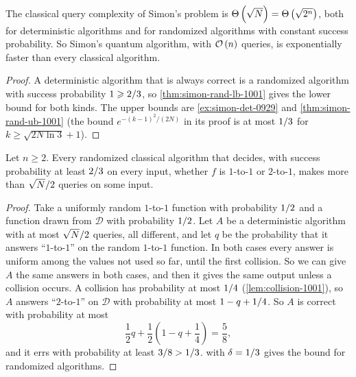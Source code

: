 \begin{corollary}\label{thm:simon-det-lb-1001}
    The classical query complexity of Simon's problem is $\Theta\left(\sqrt{N}\right) = \Theta\left(\sqrt{2^n}\right)$, both
    for deterministic algorithms and for randomized algorithms with constant success probability.
    So Simon's quantum algorithm, with $\mathcal{O}\left(n\right)$ queries, is exponentially faster than every
    classical algorithm.
\end{corollary}

\begin{proof}
    A deterministic algorithm that is always correct is a randomized algorithm with success
    probability $1 \geqslant 2/3$, so \cref{thm:simon-rand-lb-1001} gives the lower bound for both
    kinds. The upper bounds are \cref{ex:simon-det-0929} and \cref{thm:simon-rand-ub-1001} (the
    bound $e^{-(k-1)^2/(2N)}$ in its proof is at most $1/3$ for $k \geq \sqrt{2N \ln 3} + 1$).
\end{proof}

\begin{corollary}\label{cor:simon-decision-1001}
    Let $n \geq 2$. Every randomized classical algorithm that decides, with success probability at
    least $2/3$ on every input, whether $f$ is $1$-to-$1$ or $2$-to-$1$, makes more than
    $\sqrt{N}/2$ queries on some input.
\end{corollary}

\begin{proof}
    Take a uniformly random $1$-to-$1$ function with probability $1/2$ and a function drawn
    from $\mathcal{D}$ with probability $1/2$. Let $A$ be a deterministic algorithm with at
    most $\sqrt{N}/2$ queries, all different, and let $q$ be the probability that it answers
    ``$1$-to-$1$'' on the random $1$-to-$1$ function. In both cases every answer is uniform among the
    values not used so far, until the first collision. So we can give $A$ the same answers in both
    cases, and then it gives the same output unless a collision occurs. A collision has probability
    at most $1/4$ (\cref{lem:collision-1001}), so $A$ answers ``$2$-to-$1$'' on
    $\mathcal{D}$ with probability at most $1 - q + 1/4$. So $A$ is correct with probability
    at most
    \[\frac{1}{2} q + \frac{1}{2}\left(1 - q + \frac{1}{4}\right) = \frac{5}{8},\]
    and it errs with probability at least $3/8 > 1/3$.  with
    $\delta = 1/3$ gives the bound for randomized algorithms.
\end{proof}

